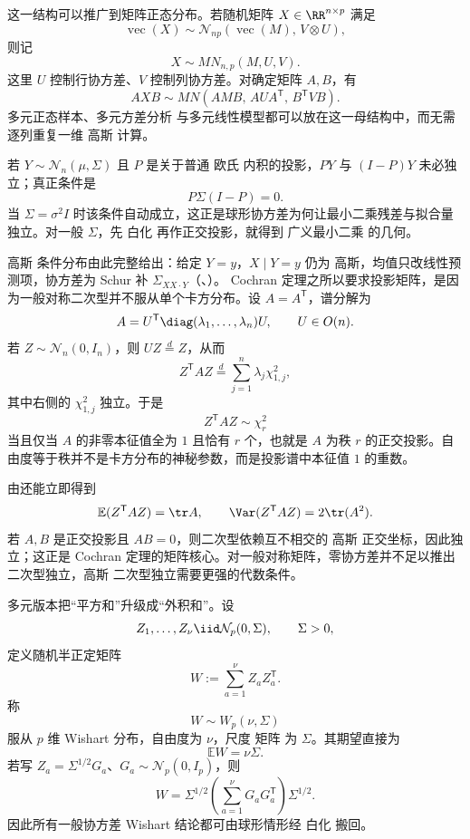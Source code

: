 这一结构可以推广到矩阵正态分布。若随机矩阵 $X\in\RR^{n\times p}$ 满足
\[
\operatorname{vec}(X)
\sim
\mathcal N_{np}(\operatorname{vec}(M),\,V\otimes U),
\]
则记
\begin{equation*}X\sim MN_{n,p}(M,U,V).\end{equation*}
这里 $U$ 控制行协方差、$V$ 控制列协方差。对确定矩阵 $A,B$，有
\begin{equation*}AXB
\sim
MN(AMB,\,AUA^{\mathsf T},\,B^{\mathsf T}VB).\end{equation*}
多元正态样本、多元方差分析 与多元线性模型都可以放在这一母结构中，而无需逐列重复一维 高斯 计算。

若 $Y\sim\mathcal N_n(\mu,\Sigma)$ 且 $P$ 是关于普通 欧氏 内积的投影，$PY$ 与 $(I-P)Y$ 未必独立；真正条件是
\[
P\Sigma(I-P)=0.
\]
当 $\Sigma=\sigma^2I$ 时该条件自动成立，这正是球形协方差为何让最小二乘残差与拟合量独立。对一般 $\Sigma$，先 白化 再作正交投影，就得到 广义最小二乘 的几何。

高斯 条件分布由此完整给出：给定 $Y=y$，$X\mid Y=y$ 仍为 高斯，均值只改线性预测项，协方差为 Schur 补 $\Sigma_{XX\cdot Y}$（、）。
Cochran 定理之所以要求投影矩阵，是因为一般对称二次型并不服从单个卡方分布。设 $A=A^{\mathsf T}$，谱分解为
\[
A=U^{\mathsf T}\diag(\lambda_1,\ldots,\lambda_n)U,
\qquad U\in O(n).
\]
若 $Z\sim\mathcal N_n(0,I_n)$，则 $UZ\overset{d}=Z$，从而
\begin{equation}
{
Z^{\mathsf T}AZ
\overset{d}=\sum_{j=1}^n\lambda_j\chi^2_{1,j},
}
\label{eq:math-stat-general-gaussian-quadratic-form}
\end{equation}
其中右侧的 $\chi^2_{1,j}$ 独立。于是
\[
Z^{\mathsf T}AZ\sim\chi^2_r
\]
当且仅当 $A$ 的非零本征值全为 $1$ 且恰有 $r$ 个，也就是 $A$ 为秩 $r$ 的正交投影。自由度等于秩并不是卡方分布的神秘参数，而是投影谱中本征值 $1$ 的重数。

由还能立即得到
\begin{equation*}\mathbb E(Z^{\mathsf T}AZ)=\tr A,
\qquad
\Var(Z^{\mathsf T}AZ)=2\tr(A^2).\end{equation*}
若 $A,B$ 是正交投影且 $AB=0$，则二次型依赖互不相交的 高斯 正交坐标，因此独立；这正是 Cochran 定理的矩阵核心。对一般对称矩阵，零协方差并不足以推出二次型独立，高斯 二次型独立需要更强的代数条件。

多元版本把“平方和”升级成“外积和”。设
\[
Z_1,\ldots,Z_\nu\iid\mathcal N_p(0,\Sigma),
\qquad \Sigma>0,
\]
定义随机半正定矩阵
\begin{equation*}W:=\sum_{a=1}^{\nu}Z_aZ_a^{\mathsf T}.\end{equation*}
称
\[
W\sim W_p(\nu,\Sigma)
\]
服从 $p$ 维 Wishart 分布，自由度为 $\nu$，尺度 矩阵 为 $\Sigma$。其期望直接为
\begin{equation*}\mathbb E W=\nu\Sigma.\end{equation*}
若写 $Z_a=\Sigma^{1/2}G_a$、$G_a\sim\mathcal N_p(0,I_p)$，则
\begin{equation*}W
=\Sigma^{1/2}
\left(\sum_{a=1}^{\nu}G_aG_a^{\mathsf T}\right)
\Sigma^{1/2}.\end{equation*}
因此所有一般协方差 Wishart 结论都可由球形情形经 白化 搬回。

